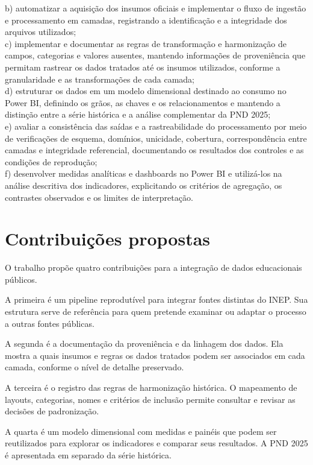 b) automatizar a aquisição dos insumos oficiais e implementar o fluxo de ingestão e processamento em camadas, registrando a identificação e a integridade dos arquivos utilizados;\\

c) implementar e documentar as regras de transformação e harmonização de campos, categorias e valores ausentes, mantendo informações de proveniência que permitam rastrear os dados tratados até os insumos utilizados, conforme a granularidade e as transformações de cada camada;\\

d) estruturar os dados em um modelo dimensional destinado ao consumo no Power BI, definindo os grãos, as chaves e os relacionamentos e mantendo a distinção entre a série histórica e a análise complementar da PND 2025;\\

e) avaliar a consistência das saídas e a rastreabilidade do processamento por meio de verificações de esquema, domínios, unicidade, cobertura, correspondência entre camadas e integridade referencial, documentando os resultados dos controles e as condições de reprodução;\\

f) desenvolver medidas analíticas e dashboards no Power BI e utilizá-los na análise descritiva dos indicadores, explicitando os critérios de agregação, os contrastes observados e os limites de interpretação.

\section{Contribuições propostas}

O trabalho propõe quatro contribuições para a integração de dados educacionais públicos.

A primeira é um pipeline reprodutível para integrar fontes distintas do INEP. Sua estrutura serve de referência para quem pretende examinar ou adaptar o processo a outras fontes públicas.

A segunda é a documentação da proveniência e da linhagem dos dados. Ela mostra a quais insumos e regras os dados tratados podem ser associados em cada camada, conforme o nível de detalhe preservado.

A terceira é o registro das regras de harmonização histórica. O mapeamento de layouts, categorias, nomes e critérios de inclusão permite consultar e revisar as decisões de padronização.

A quarta é um modelo dimensional com medidas e painéis que podem ser reutilizados para explorar os indicadores e comparar seus resultados. A PND 2025 é apresentada em separado da série histórica.


